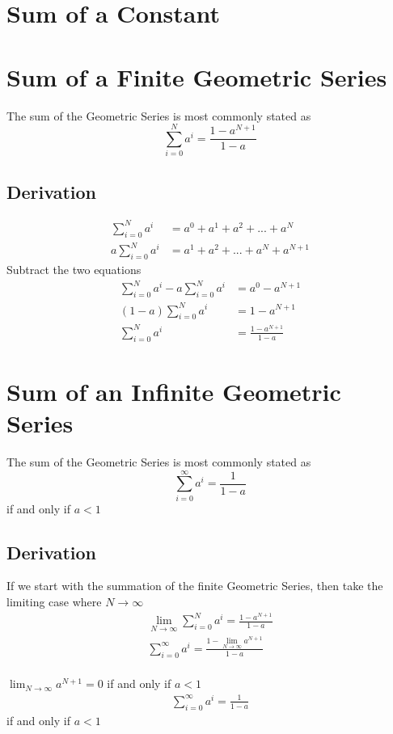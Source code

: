 
\section{Sum of a Constant}

\section{Sum of a Finite Geometric Series}
The sum of the Geometric Series is most commonly stated as
\[ \sum_{i=0}^N{a^i} = \frac{1 - a^{N+1}}{1-a} \]

\subsection{Derivation}
\begin{align*}
\sum_{i=0}^N{a^i} &= a^0 + a^1 + a^2 + ... + a^N  \\
a\sum_{i=0}^N{a^i} &= a^1 + a^2 + ... + a^N + a^{N+1}
\end{align*}
Subtract the two equations
\begin{align*}
\sum_{i=0}^N{a^i} - a\sum_{i=0}^N{a^i} &= a^0 - a^{N+1}  \\
(1-a)\sum_{i=0}^N{a^i} &= 1 - a^{N+1} \\
\sum_{i=0}^N{a^i} &= \frac{1 - a^{N+1}}{1-a}
\end{align*}

\section{Sum of an Infinite Geometric Series}
The sum of the Geometric Series is most commonly stated as
\[ \sum_{i=0}^\infty{a^i} = \frac{1}{1-a} \]
if and only if \(a<1\)

\subsection{Derivation}
If we start with the summation of the finite Geometric Series, then take the limiting case where \(N\to \infty\) \\

\begin{align*}
\lim_{N\to \infty} \sum_{i=0}^N{a^i} = \frac{1 - a^{N+1}}{1-a} \\
\sum_{i=0}^\infty{a^i} = \frac{1 - \lim_{N\to \infty}a^{N+1}}{1-a}
\end{align*}
\\
\(\lim_{ N\to \infty}a^{N+1} =0 \) if and only if \(a<1\) \\
\begin{align*}
\sum_{i=0}^\infty{a^i} = \frac{1}{1-a}
\end{align*}
if and only if \(a<1\)


